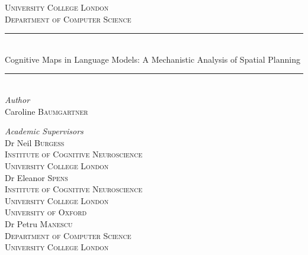 \documentclass[11pt,a4paper,oneside]{book}
\begin{document}
\pagestyle{plain}
\frontmatter
\begin{titlepage} %
	\newcommand{\HRule}{\rule{\linewidth}{0.5mm}} %
	
	\center %
	\textsc{\LARGE University College London}\\[1.5cm] %
	
	\textsc{\Large Department of Computer Science}\\[0.5cm] %
	
	\HRule\\[0.4cm]
	{\huge Cognitive Maps in Language Models: A Mechanistic Analysis of Spatial Planning}\\[0.4cm] %
	\HRule\\[1.5cm]
	{\large\textit{Author}}\\
	Caroline \textsc{Baumgartner} %
	\vfill
	\begin{minipage}{1.0\textwidth}
		\begin{center}
			\large
			\textit{Academic Supervisors}\\
			Dr Neil \textsc{Burgess}\\
			\textsc{Institute of Cognitive Neuroscience}\\
			\textsc{University College London}\\[0.3cm]
			Dr Eleanor \textsc{Spens}\\
			\textsc{Institute of Cognitive Neuroscience}\\
			\textsc{University College London}\\
			\textsc{University of Oxford}\\[0.3cm]
			Dr Petru \textsc{Manescu}\\
			\textsc{Department of Computer Science}\\
			\textsc{University College London}
		\end{center}
	\end{minipage}
	\vfill\vfill\vfill %
	

\end{titlepage}
\end{document}
